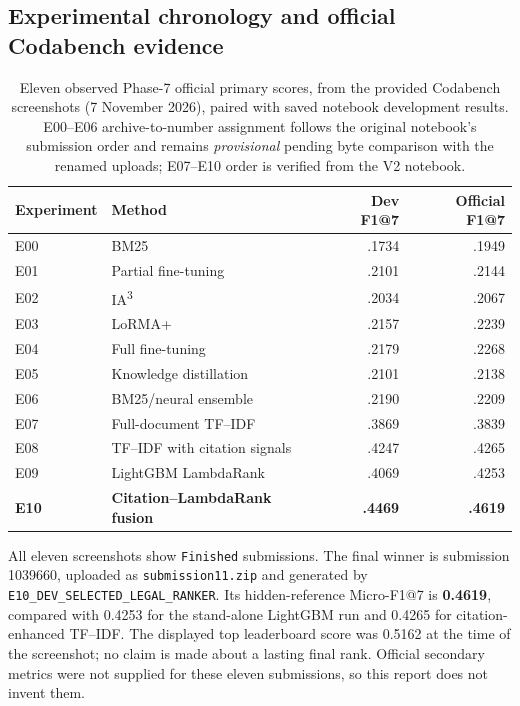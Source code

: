 \subsection{Experimental chronology and official Codabench evidence}
\label{subsec:p7-results}
\begin{table}[htbp]
\centering
\small
\caption{Eleven observed Phase-7 official primary scores, from the provided
Codabench screenshots (7 November 2026), paired with saved notebook development
results. E00--E06 archive-to-number assignment follows the original notebook's
submission order and remains \emph{provisional} pending byte comparison with the
renamed uploads; E07--E10 order is verified from the V2 notebook.}
\label{tab:p7-scores}
\begin{tabular}{llrr}
\toprule
Experiment & Method & Dev F1@7 & Official F1@7 \\
\midrule
E00 & BM25 & .1734 & .1949 \\
E01 & Partial fine-tuning & .2101 & .2144 \\
E02 & IA\textsuperscript{3} & .2034 & .2067 \\
E03 & LoRMA+ & .2157 & .2239 \\
E04 & Full fine-tuning & .2179 & .2268 \\
E05 & Knowledge distillation & .2101 & .2138 \\
E06 & BM25/neural ensemble & .2190 & .2209 \\
\midrule
E07 & Full-document TF--IDF & .3869 & .3839 \\
E08 & TF--IDF with citation signals & .4247 & .4265 \\
E09 & LightGBM LambdaRank & .4069 & .4253 \\
\textbf{E10} & \textbf{Citation--LambdaRank fusion} & \textbf{.4469} & \textbf{.4619} \\
\bottomrule
\end{tabular}
\end{table}

All eleven screenshots show \texttt{Finished} submissions. The final winner is
submission 1039660, uploaded as \texttt{submission11.zip} and generated by
\texttt{E10\_DEV\_SELECTED\_LEGAL\_RANKER}. Its hidden-reference
Micro-F1@7 is \textbf{0.4619}, compared with 0.4253 for the stand-alone
LightGBM run and 0.4265 for citation-enhanced TF--IDF. The displayed top
leaderboard score was 0.5162 at the time of the screenshot; no claim is
made about a lasting final rank. Official secondary metrics were not supplied
for these eleven submissions, so this report does not invent them.


